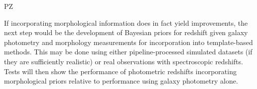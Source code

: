 {\begin{tasklist}{PZ}
\begin{task}
{If incorporating morphological information does in fact yield improvements, the next step would be the development of Bayesian priors for redshift given galaxy photometry and morphology measurements for incorporation into template-based methods.  This may be done using either pipeline-processed simulated datasets (if they are sufficiently realistic) or real observations with spectroscopic redshifts.  Tests will then show the performance of photometric redshifts incorporating morphological priors relative to performance using galaxy photometry alone. 
}
~\\
\end{task}
\end{tasklist}
}
